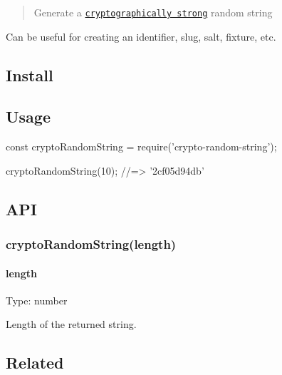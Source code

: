 \begin{quote}
Generate a \href{https://en.m.wikipedia.org/wiki/Strong_cryptography}{\tt cryptographically strong} random string \end{quote}


Can be useful for creating an identifier, slug, salt, fixture, etc.

\subsection*{Install}




\subsection*{Usage}


\begin{DoxyCode}
const cryptoRandomString = require('crypto-random-string');

cryptoRandomString(10);
//=> '2cf05d94db'
\end{DoxyCode}


\subsection*{A\+PI}

\subsubsection*{crypto\+Random\+String(length)}

\paragraph*{length}

Type\+: {\ttfamily number}

Length of the returned string.

\subsection*{Related}


